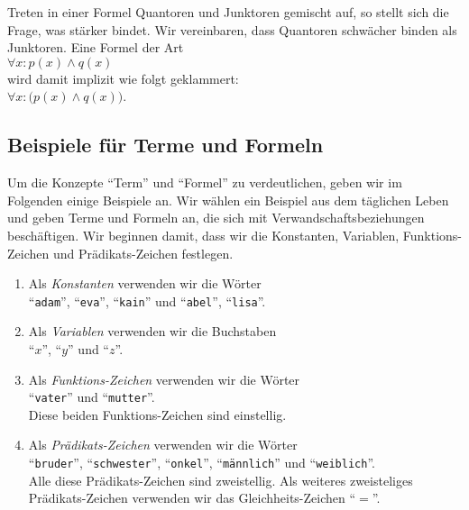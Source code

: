 \begin{enumerate}
      Treten in einer Formel Quantoren und Junktoren gemischt auf, so stellt sich die
      Frage, was stärker bindet.  Wir vereinbaren, dass Quantoren schwächer binden als
      Junktoren.  Eine Formel der Art \\[0.2cm]
      \hspace*{1.3cm} $\forall x \colon p(x) \wedge q(x)$ \\[0.2cm]
      wird damit implizit wie folgt geklammert: \\[0.2cm]
      \hspace*{1.3cm} $\forall x \colon \bigl(p(x) \wedge q(x)\bigr)$. 
\end{enumerate}

\subsection{Beispiele für Terme und Formeln}
Um die Konzepte ``Term'' und ``Formel'' zu verdeutlichen, geben wir im Folgenden einige
Beispiele an.  Wir wählen ein Beispiel aus dem täglichen Leben und geben Terme und Formeln an, die sich mit
Verwandschaftsbeziehungen beschäftigen.  Wir beginnen damit, dass wir die Konstanten,
Variablen, Funktions-Zeichen und Prädikats-Zeichen festlegen.
\begin{enumerate}
\item Als \emph{Konstanten} verwenden wir die Wörter \\[0.2cm]
      \hspace*{1.3cm} ``\texttt{adam}'', ``\texttt{eva}'', ``\texttt{kain}'' und ``\texttt{abel}'',
      ``\texttt{lisa}''.
\item Als \emph{Variablen} verwenden wir die Buchstaben \\[0.2cm]
      \hspace*{1.3cm} ``$x$'', ``$y$'' und ``$z$''.
\item Als \emph{Funktions-Zeichen} verwenden wir die Wörter \\[0.2cm]
      \hspace*{1.3cm} ``\texttt{vater}'' und ``\texttt{mutter}''. \\[0.2cm]
      Diese beiden Funktions-Zeichen sind einstellig. 
\item Als \emph{Prädikats-Zeichen} verwenden wir die Wörter \\[0.2cm]
      \hspace*{1.3cm} ``\texttt{bruder}'', ``\texttt{schwester}'', ``\texttt{onkel}'',
      ``\texttt{männlich}'' und ``\texttt{weiblich}''. \\[0.2cm]
      Alle diese Prädikats-Zeichen sind zweistellig.  Als weiteres zweisteliges
      Prädikats-Zeichen verwenden wir das Gleichheits-Zeichen ``$=$''.
\end{enumerate}
